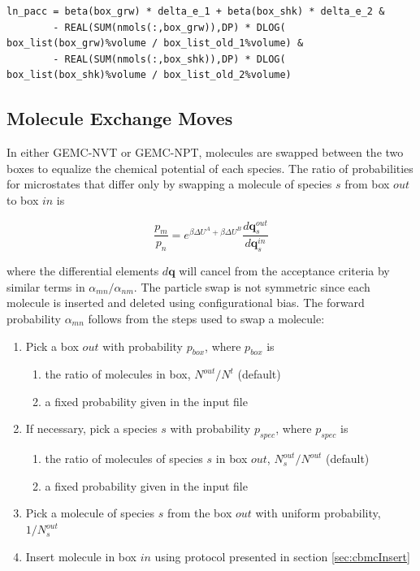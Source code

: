\begin{minipage}{\linewidth}
\begin{lstlisting}[firstnumber=402, caption=move\_vol\_swap.f90]
ln_pacc = beta(box_grw) * delta_e_1 + beta(box_shk) * delta_e_2 &
        - REAL(SUM(nmols(:,box_grw)),DP) * DLOG( box_list(box_grw)%volume / box_list_old_1%volume) &
        - REAL(SUM(nmols(:,box_shk)),DP) * DLOG( box_list(box_shk)%volume / box_list_old_2%volume)

\end{lstlisting}
\end{minipage}

\subsection{Molecule Exchange Moves} 
\label{sec:mol_swap}

In either GEMC-NVT or GEMC-NPT, molecules are swapped between the two boxes to equalize the chemical potential of each species.
The ratio of probabilities for microstates that differ only by swapping a molecule of species $s$ from box $out$ to box $in$ is

\begin{equation}
\frac{p_m}{p_n} = e^{\beta \Delta U^A + \beta \Delta U^B} \frac{d\mathbf{q}_s^{out}}{d\mathbf{q}_s^{in}}
\label{eq:pGENPT_ratio_mol}
\end{equation}

where the differential elements $d\mathbf{q}$ will cancel from the acceptance criteria by similar terms in $\alpha_{mn}/\alpha_{nm}$.
The particle swap is not symmetric since each molecule is inserted and deleted using configurational bias.
The forward probability $\alpha_{mn}$ follows from the steps used to swap a molecule:

\begin{enumerate}
\item Pick a box $out$ with probability $p_{box}$, where $p_{box}$ is
	\begin{enumerate}
	\item the ratio of molecules in box, $N^{out}/N^t$ (default)
   \item a fixed probability given in the input file
	\end{enumerate}
\item If necessary, pick a species $s$ with probability $p_{spec}$, where $p_{spec}$ is
	\begin{enumerate}
	\item the ratio of molecules of species $s$ in box $out$, $N^{out}_s/N^{out}$ (default)
   \item a fixed probability given in the input file
	\end{enumerate}
\item Pick a molecule of species $s$ from the box $out$ with uniform probability, $1/N^{out}_s$
\item Insert molecule in box $in$ using protocol presented in section \ref{sec:cbmcInsert}
\end{enumerate}

